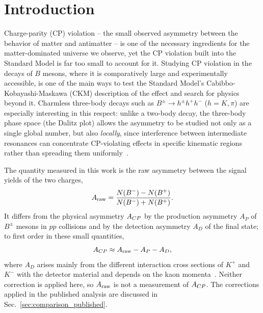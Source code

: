 \section{Introduction}
\label{sec:intro}
Charge-parity (CP) violation -- the small observed asymmetry between the behavior of matter and antimatter -- is one of the necessary ingredients for the matter-dominated universe we observe, yet the CP violation built into the Standard Model is far too small to account for it. Studying CP violation in the decays of $B$ mesons, where it is comparatively large and experimentally accessible, is one of the main ways to test the Standard Model's Cabibbo-Kobayashi-Maskawa (CKM) description of the effect and search for physics beyond it. Charmless three-body decays such as $B^{\pm}\to h^{\pm}h^{+}h^{-}$ ($h=K,\pi$) are especially interesting in this respect: unlike a two-body decay, the three-body phase space (the Dalitz plot) allows the asymmetry to be studied not only as a single global number, but also \emph{locally}, since interference between intermediate resonances can concentrate CP-violating effects in specific kinematic regions rather than spreading them uniformly~\cite{lhcb_cpv_prd2023,lhcb_cpv_paper}.

The quantity measured in this work is the raw asymmetry between the signal yields of the two charges,
\begin{equation}
A_{\mathrm{raw}}=\frac{N(B^-)-N(B^+)}{N(B^-)+N(B^+)} .
\label{eq:araw}
\end{equation}
It differs from the physical asymmetry $A_{CP}$ by the production asymmetry $A_P$ of $B^\pm$ mesons in $pp$ collisions and by the detection asymmetry $A_D$ of the final state; to first order in these small quantities,
\begin{equation}
A_{CP}\approx A_{\mathrm{raw}}-A_P-A_D ,
\label{eq:acp}
\end{equation}
where $A_D$ arises mainly from the different interaction cross sections of $K^+$ and $K^-$ with the detector material and depends on the kaon momenta~\cite{lhcb_cpv_prd2023}. Neither correction is applied here, so $A_{\mathrm{raw}}$ is not a measurement of $A_{CP}$. The corrections applied in the published analysis are discussed in Sec.~\ref{sec:comparison_published}.


